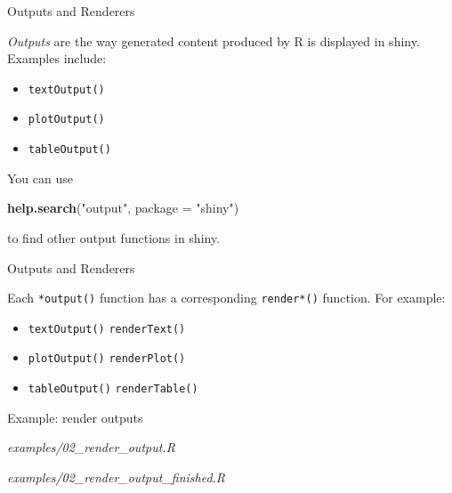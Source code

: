 \documentclass[
  12pt,
  ignorenonframetext,
]{beamer}
\newenvironment{Shaded}{\begin{snugshade}}{\end{snugshade}}
\newcommand{\DataTypeTok}[1]{\textcolor[rgb]{0.13,0.29,0.53}{#1}}
\newcommand{\KeywordTok}[1]{\textcolor[rgb]{0.13,0.29,0.53}{\textbf{#1}}}
\newcommand{\NormalTok}[1]{#1}
\newcommand{\StringTok}[1]{\textcolor[rgb]{0.31,0.60,0.02}{#1}}
\providecommand{\tightlist}{%
  \setlength{\itemsep}{0pt}\setlength{\parskip}{0pt}}
\begin{document}
\begin{frame}[fragile]{Outputs and Renderers}
\protect\hypertarget{outputs-and-renderers}{}

\emph{Outputs} are the way generated content produced by R is displayed
in shiny. Examples include:

\begin{itemize}
\item
  \texttt{textOutput()}
\item
  \texttt{plotOutput()}
\item
  \texttt{tableOutput()}
\end{itemize}

You can use

\begin{Shaded}
\begin{Highlighting}[]
\KeywordTok{help.search}\NormalTok{(}\StringTok{"output"}\NormalTok{, }\DataTypeTok{package =} \StringTok{"shiny"}\NormalTok{)}
\end{Highlighting}
\end{Shaded}

to find other output functions in shiny.

\end{frame}

\begin{frame}[fragile]{Outputs and Renderers}
\protect\hypertarget{outputs-and-renderers-1}{}

Each \texttt{*output()} function has a corresponding \texttt{render*()}
function. For example:

\begin{itemize}[<+->]
\tightlist
\item
  \texttt{textOutput()} \rightarrow \texttt{renderText()}
\end{itemize}

\begin{itemize}[<+->]
\tightlist
\item
  \texttt{plotOutput()} \rightarrow \texttt{renderPlot()}
\end{itemize}

\begin{itemize}[<+->]
\tightlist
\item
  \texttt{tableOutput()} \rightarrow \texttt{renderTable()}
\end{itemize}

\end{frame}

\begin{frame}{Example: render outputs}
\protect\hypertarget{example-render-outputs}{}

\begin{description}
\tightlist
\item[Start]
\emph{examples/02\_render\_output.R}
\item[Finished]
\emph{examples/02\_render\_output\_finished.R}
\end{description}

\end{frame}
\end{document}
